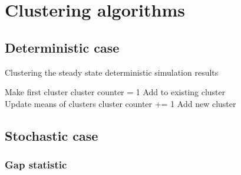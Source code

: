 
\section{Clustering algorithms}

\subsection{Deterministic case}
\begin{algorithm}
\label{alg:DetClustering}
  \caption{Clustering the steady state deterministic simulation results}
 \begin{algorithmic}[1]
    \Statex
      
      		\State Make first cluster
      		\State cluster counter = 1
      	\Else
      					\State Add to existing cluster \\
      					\State Update means of clusters
      			\EndIf
      				\State cluster counter +=  1
      				\State Add new cluster

      			\EndIf
      		\EndFor
      	\EndIf
	
      \EndFor

        
  \end{algorithmic}
\end{algorithm}
\newpage
\subsection{Stochastic case}
\subsubsection{Gap statistic}

